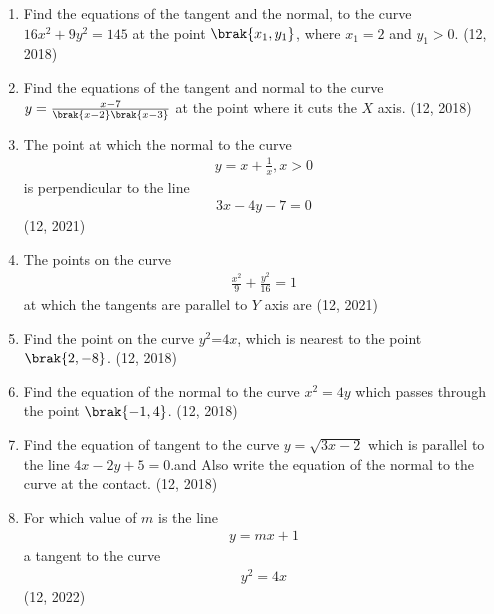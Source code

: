 \begin{enumerate}[label=\thesubsection.\arabic*,ref=\thesubsection.\theenumi]
\item Find the equations of the tangent and the normal, to the curve $16x^{2}+9y^{2}=145$ at the point $\brak{x_1,y_1}$, where $x_1=2$ and $y_1>0$. \hfill (12, 2018)
\item Find the equations of the tangent and normal to the curve $y = \frac{x - 7}{\brak{x - 2}\brak{x - 3}}$ at the point where it cuts the $X$ axis.
\hfill (12, 2018)
\item The point at which the normal to the curve 
\begin{align*}
    y = x+\frac{1}{x}, x>0 
\end{align*}
 is perpendicular to the line
 \begin{align*}
     3x-4y-7 = 0 
 \end{align*}
\hfill (12, 2021)
         \item The points on the curve
         \begin{align*}
             \frac{x^2}{9} +\frac{y^2}{16} = 1
         \end{align*}
         at which the tangents are parallel to $Y$ axis are
\hfill (12, 2021)
\item Find the point on the curve $y^2$=$4x$, which is nearest to the point $\brak{2,-8}$.  
\hfill (12, 2018)
\item Find the equation of the normal to the curve ${x}^2 = 4y$ which passes through the point $\brak{-1, 4}$.
\hfill (12, 2018)
\item Find the equation of tangent to the curve $y=\sqrt{3x-2}$ which is parallel to the line $4x-2y+5=0$.and Also write the equation of the normal to the curve at the contact.
\hfill (12, 2018)
         \item For which value of $m$ is the line
         \begin{align*}
            y = mx + 1 
         \end{align*}a tangent to the curve 
        \begin{align*}
            y^2 = 4x 
        \end{align*}
\hfill (12, 2022)
\end{enumerate} 
